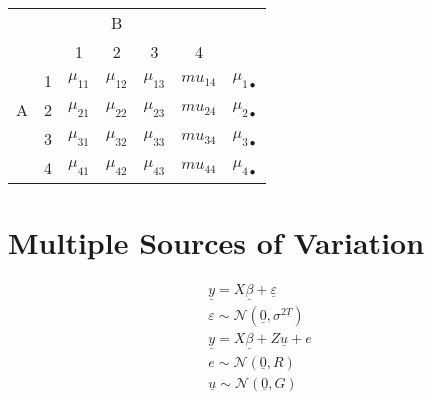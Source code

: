 \documentclass[12pt,letterpaper,oneside]{article}\usepackage{graphicx, color}
\newcommand{\dateTaken}{January 7, 2013}
\begin{document}
\renewcommand{\dateTaken}{February 21, 2013}
\daysep
\begin{tabular}{ccccccc}
   &   &    & B  &    &    & \\
   &   &  1 &  2 &  3 &  4 & \\
   & 1 &  $\mu_{11}$ &  $\mu_{12}$ &  $\mu_{13}$ &  $mu_{14}$ &  $\mu_{1\bullet}$\\ %
 A & 2 &  $\mu_{21}$ &  $\mu_{22}$ &  $\mu_{23}$ &  $mu_{24}$ &  $\mu_{2\bullet}$\\ %
   & 3 &  $\mu_{31}$ &  $\mu_{32}$ &  $\mu_{33}$ &  $mu_{34}$ &  $\mu_{3\bullet}$\\ %
   & 4 &  $\mu_{41}$ &  $\mu_{42}$ &  $\mu_{43}$ &  $mu_{44}$ &  $\mu_{4\bullet}$\\ %
\end{tabular}

\section{Multiple Sources of Variation} %
\label{sec:multiple_sources_of_variation}
\begin{align*}
    \underline{y}= X\underline{\beta} + \underline{\varepsilon}\\
    \varepsilon \sim \mathcal{N}(\underline{0}, \sigma^{2 \underline{T}})\\
    \underline{y} = X \underline{\beta} + Z \underline{u} + e\\
    e\sim \mathcal{N}(\underline{0}, R)\\
    \underline{u} \sim \mathcal{N}(\underline{0}, G)\\
\end{align*}
\end{document}
